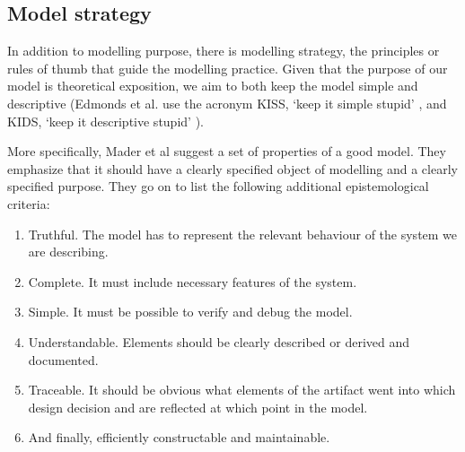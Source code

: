 \subsection{Model strategy}

In addition to modelling purpose, there is modelling strategy, the principles or rules of thumb that guide the modelling practice. Given that the purpose of our model is theoretical exposition, we aim to both keep the model simple and descriptive (Edmonds et al. use the acronym KISS, `keep it simple stupid' \cite{edmondsDifferentModellingPurposes2019}, and KIDS, `keep it descriptive stupid' \cite{edmondsDifferentModellingPurposes2019}). %

More specifically, Mader et al \cite{maderConstructionVerificationModels2007} suggest a set of properties of a good model. They emphasize that it should have a clearly specified object of modelling and a clearly specified purpose. They go on to list the  following additional epistemological criteria:
\begin{enumerate}   
\item  Truthful. The model has to represent the relevant behaviour of the system we are describing.
\item  Complete. It must include necessary features of the system.
\item Simple. It must be possible to verify and debug the model.
\item Understandable. Elements should be clearly described or derived and documented.
\item  Traceable.  It should be obvious what elements of the artifact went into which design decision and are reflected at which point in the model.
\item  And finally, efficiently constructable and maintainable.
\end{enumerate}

